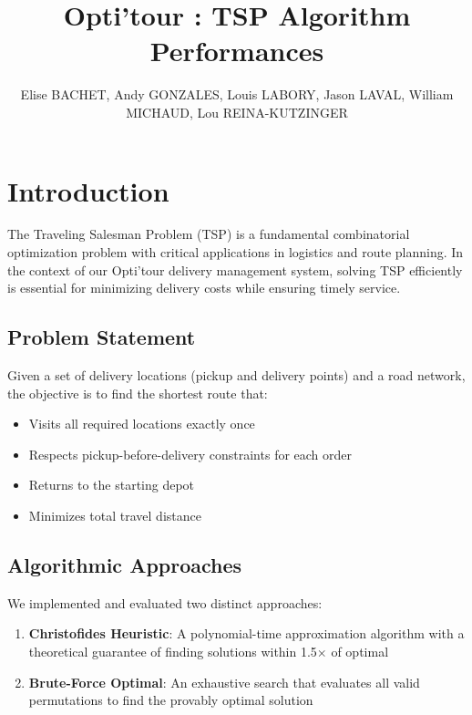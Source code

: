 \documentclass[9pt,a4paper,twoside]{tau}
\title{Opti'tour : TSP Algorithm Performances}
\author[]{Elise BACHET, Andy GONZALES, Louis LABORY, Jason LAVAL, William MICHAUD, Lou REINA-KUTZINGER}
\begin{document}
\maketitle\thispagestyle{firststyle}\tauabstract


\section{Introduction}

The Traveling Salesman Problem (TSP) is a fundamental combinatorial optimization problem with critical applications in logistics and route planning. In the context of our Opti'tour delivery management system, solving TSP efficiently is essential for minimizing delivery costs while ensuring timely service.

\subsection{Problem Statement}

Given a set of delivery locations (pickup and delivery points) and a road network, the objective is to find the shortest route that:
\begin{itemize}
    \item Visits all required locations exactly once
    \item Respects pickup-before-delivery constraints for each order
    \item Returns to the starting depot
    \item Minimizes total travel distance
\end{itemize}

\subsection{Algorithmic Approaches}

We implemented and evaluated two distinct approaches:

\begin{enumerate}
    \item \textbf{Christofides Heuristic}: A polynomial-time approximation algorithm with a theoretical guarantee of finding solutions within 1.5$\times$ of optimal
    \item \textbf{Brute-Force Optimal}: An exhaustive search that evaluates all valid permutations to find the provably optimal solution
\end{enumerate}
\end{document}

